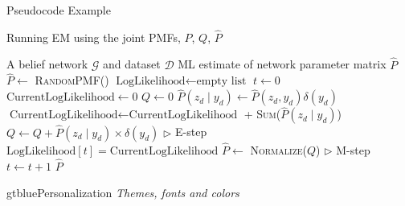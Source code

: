 \documentclass{beamer}
\begin{document}
\renewcommand{\algorithmicrequire}{\textbf{Input:}}
\renewcommand{\algorithmicensure}{\textbf{Output:}}
\newcommand*\CALL[2]{\textsc{#1}(#2)}
\newcommand*\ANNOTATE[1]{\hfill\(\triangleright\) #1}%

\footlinecolor{}

\begin{frame}[fragile]{Pseudocode Example}
\begin{algorithm}[H]
\fontsize{8}{1}\selectfont
\caption{Running EM using the joint PMFs, $P$, $Q$, $\hat P$}
\begin{algorithmic}
\REQUIRE A belief network $\mathcal{G}$ and dataset $ \mathcal{D}$
\ENSURE ML estimate of network parameter matrix $\hat P$
\STATE $\hat P \gets$ \CALL{RandomPMF}{}
\STATE $\text{LogLikelihood} \gets \text{empty list}$
\STATE $t \gets 0$
\REPEAT
    \STATE $\text{CurrentLogLikelihood} \gets 0$
    \STATE $Q \gets 0$
        \STATE $\hat P(z_d \mid y_d) \gets \hat P(z_d, y_d) \delta(y_d)$
        \STATE $\text{CurrentLogLikelihood} \gets \text{CurrentLogLikelihood}$ + \CALL{Sum}{$\hat P(z_d \mid y_d)$}
        \STATE $Q \gets Q + \hat P(z_d \mid y_d) \times \delta(y_d)$ \ANNOTATE{E-step}
    \ENDFOR
    \STATE $\text{LogLikelihood}[t] = \text{CurrentLogLikelihood}$
    \STATE $\hat P \gets$ \CALL{Normalize}{$Q$} \ANNOTATE{M-step}
    \STATE $t \gets t + 1$
\RETURN $\hat P$
\end{algorithmic}
\end{algorithm}
\end{frame}



\begin{chapter}{gtblue}{Personalization}
\textit{Themes, fonts and colors}
\end{chapter}
\end{document}
